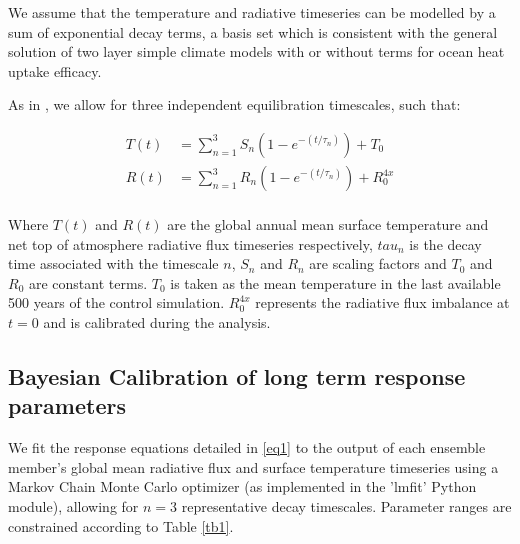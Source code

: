 \documentclass[esd, article]{copernicus}
\begin{document}
We assume that the temperature and radiative timeseries can be modelled by a sum of exponential decay terms, a basis set \cite{proistosescu2017slow,sanderson2020relating} which is consistent with the general solution of two layer simple climate models with \cite{geoffroy2013transient,winton2010importance,smith2018fair} or without \cite{geoffroy2013constant} terms for ocean heat uptake efficacy.  

As in \cite{proistosescu2017slow}, we allow for three independent equilibration timescales, such that:

\begin{subequations}
\begin{align}
   T(t)&=\sum_{n=1}^3 S_n(1-e^{-(t/\tau_n)})+T_0\label{eq1}\\
   R(t)&=\sum_{n=1}^3 R_n(1-e^{-(t/\tau_n)})+R^{4x}_{0}\label{eq2}\\
\end{align}
\end{subequations}

Where $T(t)$ and $R(t)$ are the global annual mean surface temperature and net top of atmosphere radiative flux timeseries respectively, $tau_n$ is the decay time associated with the timescale $n$, $S_n$ and $R_n$ are scaling factors and $T_0$ and $R_0$ are constant terms. $T_0$ is taken as the mean temperature in the last available 500 years of the control simulation.  $R^{4x}_0$ represents the radiative flux imbalance at $t=0$ and is calibrated during the analysis.  


\subsection{Bayesian Calibration of long term response parameters}
We fit the response equations detailed in \ref{eq1} to the output of each ensemble member's global mean radiative flux and surface temperature timeseries using a Markov Chain Monte Carlo optimizer \cite{foreman2013emcee} (as implemented in the 'lmfit' Python module), allowing for $n=3$ representative decay timescales.  Parameter ranges are constrained according to Table \ref{tb1}.  
\end{document}
